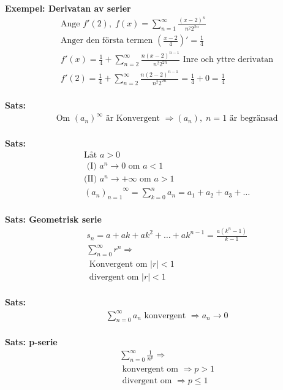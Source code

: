 \textbf{Exempel: Derivatan av serier}
\begin{align*}
  &\quad  \text{Ange } f'(2), \; f(x)= \displaystyle\sum_{n=1}^{\infty} \frac{{(x-2)}^n}{n^2 2^{2n}} \\
  &\quad  \text{Anger den första termen } \left( \frac{x-2}{4} \right)' = \frac{1}{4} \\
  &\quad  f'(x) = \frac{1}{4} + \displaystyle\sum_{n=2}^{\infty} \frac{n{(x-2)}^{n-1}}{n^2 2^{2n}}
  \text{ Inre och yttre derivatan} \\
  &\quad  f'(2) =  \frac{1}{4} + \displaystyle\sum_{n=2}^{\infty} \frac{n{(2-2)}^{n-1}}{n^2 2^{2n}}
  = \frac{1}{4} + 0 = \frac{1}{4} \\
\end{align*}


\textbf{Sats: }
\begin{align*}
  &\quad  \text{Om ${(a_n)}^{\infty}$ är Konvergent } \Rightarrow (a_n), \; n=1  \text{ är begränsad}\\
\end{align*}

\textbf{Sats: }
\begin{align*}
  &\quad  \text{Låt } a>0  \\
  &\quad  \text{ (I) } a^n\to{0} \text{ om } a<1 \\
  &\quad  \text{(II) } a^n\to{+\infty} \text{ om } a>1 \\
  &\quad  {{(a_n)}_{n=1}}^{\infty}=\displaystyle\sum_{k=0}^{n}a_n=a_1+a_2+a_3+\ldots \\
\end{align*}

\textbf{Sats: Geometrisk serie}
\begin{align*}
  &\quad  s _ { n } = a + a k + a k ^ { 2 } + \ldots + a k ^ { n - 1 } = \frac { a \left( k ^ { n } - 1 \right) }
  { k - 1 } \\
  &\quad  \displaystyle\sum_{n=0}^{\infty}r^n \Rightarrow \\
  &\quad  \text{ Konvergent om } |r|<1  \\
  &\quad  \text{ divergent om } |r|<1  \\
\end{align*}

\textbf{Sats: }
\begin{align*}
  &\quad  \displaystyle\sum_{n=0}^{\infty}a_n \text{ konvergent } \Rightarrow a_n\to{0} \\
\end{align*}

\textbf{Sats: p-serie}
\begin{align*}
  &\quad  \displaystyle\sum_{n=0}^{\infty}\frac{1}{n^p} \Rightarrow \\
  &\quad  \text{ konvergent om } \Rightarrow p>1 \\
  &\quad  \text{ divergent om } \Rightarrow p\leq1 \\  
\end{align*}

